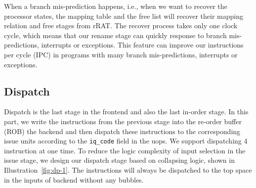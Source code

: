 When a branch mis-prediction happens, i.e., when we want to recover the processor states, the mapping table and the free list will recover their mapping relation and free stages from rRAT. The recover process takes only one clock cycle, which means that our rename stage can quickly response to branch mis-predictions, interrupts or exceptions. This feature can improve our instructions per cycle (IPC) in programs with many branch mis-predictions, interrupts or exceptions.

\subsection{Dispatch} %

Dispatch is the last stage in the frontend and also the last in-order stage. In this part, we write the instructions from the previous stage into the re-order buffer (ROB) the backend and then dispatch these instructions to the corresponding issue units according to the \texttt{iq\_code} field in the uops. We support dispatching 4 instruction at one time. To reduce the logic complexity of input selection in the issue stage, we design our dispatch stage based on collapsing logic, shown in Illustration~\ref{fig:dp-1}. The instructions will always be dispatched to the top space in the inputs of backend without any bubbles.

